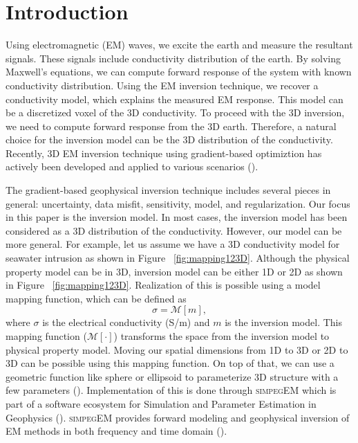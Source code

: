 \documentclass{segabs}
\newcommand{\simpegEM}{\textsc{simpegEM}\xspace}
\begin{document}
\section{Introduction}
Using electromagnetic (EM) waves, we excite the earth and measure the resultant signals.
These signals include conductivity distribution of the earth. By solving Maxwell's
equations, we can compute forward response of the system with known conductivity
distribution.
Using the EM inversion technique, we recover a conductivity model, which explains the
measured EM response.
This model can be a discretized voxel of the 3D conductivity.
To proceed with the 3D inversion, we need to compute forward response from the 3D earth.
Therefore, a natural choice for the inversion model can be the 3D distribution of the conductivity.
Recently, 3D EM inversion technique using gradient-based optimiztion has actively been
developed and applied to various scenarios (\cite{Doug2013,Gribenko2007,Chung2014}).

The gradient-based geophysical inversion technique includes several pieces in general:
uncertainty, data misfit, sensitivity, model, and regularization.
Our focus in this paper is the inversion model.
In most cases, the inversion model has been considered as a 3D distribution of the conductivity.
However, our model can be more general. For example, let us assume we have a 3D conductivity
model for seawater intrusion as shown in Figure ~\ref{fig:mapping123D}.
Although the physical property model can be in 3D, inversion model can be either 1D or 2D
as shown in Figure ~\ref{fig:mapping123D}.
Realization of this is possible using a model mapping function, which can be defined as
\begin{equation}
  \sigma  = \mathcal{M}[m],
\end{equation}
where $\sigma$ is the electrical conductivity (S/m) and $m$ is the inversion model. This mapping function
($\mathcal{M}[\cdot]$) transforms the space from the inversion model to physical property
model. Moving our spatial dimensions from 1D to 3D or 2D to 3D can be possible using this
mapping function. On top of that, we can use a geometric function like sphere or
ellipsoid to parameterize 3D structure with a few parameters (\cite{MikeParam2014}).
Implementation of this is done through \simpegEM which is part of a software ecosystem
for Simulation and Parameter Estimation in Geophysics (\cite{SimPEG}).
\simpegEM provides forward modeling and geophysical inversion of EM methods in both frequency and time domain (\cite{SimPEGEM}).
\end{document}
